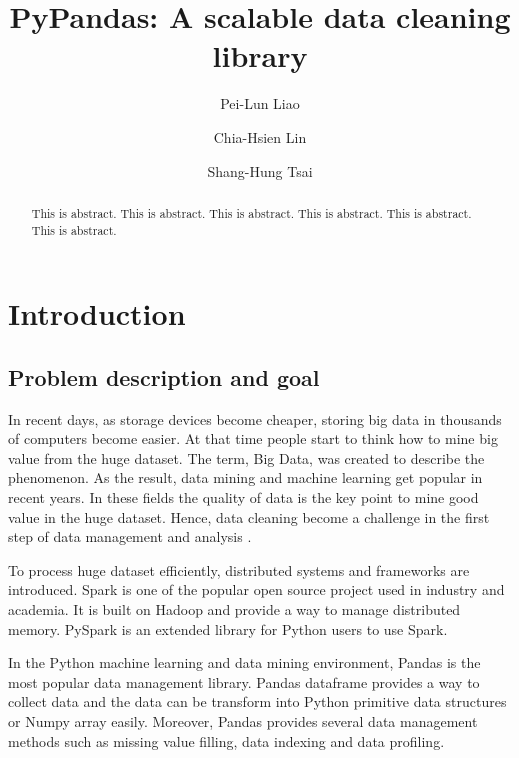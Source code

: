 \documentclass[sigconf]{acmart}
\begin{document}
\title{PyPandas: A scalable data cleaning library}

\author{Pei-Lun Liao}

\author{Chia-Hsien Lin}

\author{Shang-Hung Tsai}

\begin{abstract}
This is abstract. 
This is abstract. 
This is abstract. 
This is abstract.
This is abstract.
This is abstract.

\end{abstract}

\maketitle

\section{Introduction}

\subsection{Problem description and goal}
	In recent days, as storage devices become cheaper, storing big data in thousands of computers become easier. At that time people start to think how to mine big value from the huge dataset. The term, Big Data, was created to describe the phenomenon. As the result, data mining \cite{Han} \cite{MMD} and machine learning get popular in recent years. In these fields the quality of data is the key point to mine good value in the huge dataset. Hence, data cleaning become a challenge in the first step of data management and analysis \cite{datacleaning} \cite{DBS-045} \cite{PW}.
	
	To process huge dataset efficiently, distributed systems and frameworks \cite{mapreduce} \cite{gfs} \cite{hadoop} are introduced. Spark \cite{spark} is one of the popular open source project used in industry and academia. It is built on Hadoop \cite{hadoop} and provide a way to manage distributed memory. PySpark \cite{pyspark} is an extended library for Python users to use Spark.
	
	In the Python machine learning and data mining environment, Pandas \cite{pandas} is the most popular data management library. Pandas dataframe provides a way to collect data and the data can be transform into Python primitive data structures or Numpy \cite{numpy} array easily. Moreover, Pandas provides several data management methods such as missing value filling, data indexing and data profiling. 
	
\end{document}
